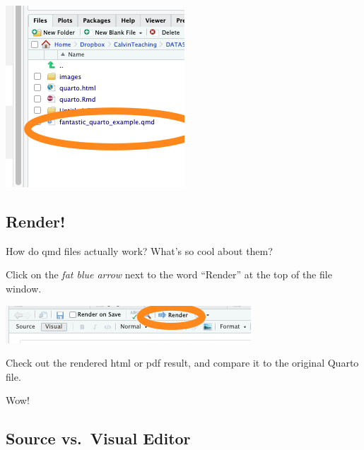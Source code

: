 \documentclass[
  letterpaper,
  DIV=11,
  numbers=noendperiod]{scrreprt}
\theoremstyle{remark}
\begin{document}
\begin{center}
\includegraphics[width=0.85\linewidth,height=\textheight,keepaspectratio]{images/qmd-in-file-pane.png}
\end{center}

\subsection{Render!}\label{render}

How do qmd files actually work? What's so cool about them?

Click on the \emph{fat blue arrow} next to the word ``Render'' at the
top of the file window.

\begin{center}
\includegraphics[width=0.85\linewidth,height=\textheight,keepaspectratio]{images/render.png}
\end{center}

Check out the rendered html or pdf result, and compare it to the
original Quarto file.

Wow!

\subsection{Source vs.~Visual Editor}\label{source-vs.-visual-editor}
\end{document}
